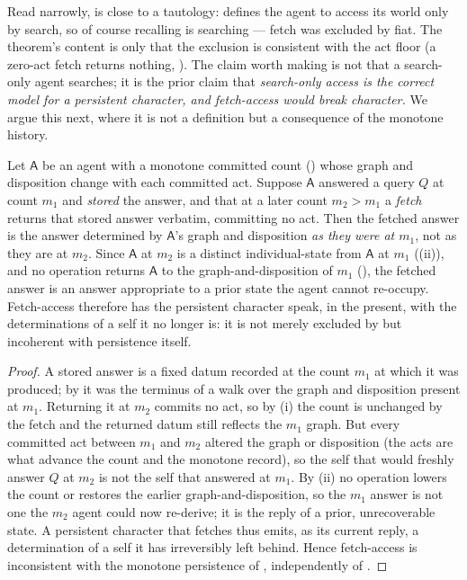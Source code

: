 \documentclass[11pt,twocolumn,a4paper]{article}
\newcommand{\Agent}{\mathsf{A}}
\newcommand{\cnt}{m}                 %
\begin{document}
\begin{remark}
\label{rem:recsearch-honest}
Read narrowly,  is close to a tautology:
 defines the agent to access its world only by search, so
of course recalling is searching --- fetch was excluded by fiat. The
theorem's content is only that the exclusion is consistent with the act
floor (a zero-act fetch returns nothing, ). The claim
worth making is not that a search-only agent searches; it is the prior
claim that \emph{search-only access is the correct model for a persistent
character, and fetch-access would break character.} We argue this next,
where it is not a definition but a consequence of the monotone history.
\end{remark}

\begin{proposition}
\label{prop:fetch-incoherent}
Let $\Agent$ be an agent with a monotone committed count
() whose graph and disposition change with each committed
act. Suppose $\Agent$ answered a query $Q$ at count $\cnt_1$ and \emph{stored}
the answer, and that at a later count $\cnt_2>\cnt_1$ a \emph{fetch}
returns that stored answer verbatim, committing no act. Then the fetched
answer is the answer determined by $\Agent$'s graph and disposition
\emph{as they were at $\cnt_1$}, not as they are at $\cnt_2$. Since
$\Agent$ at $\cnt_2$ is a distinct individual-state from $\Agent$ at
$\cnt_1$ ((ii)), and no operation returns $\Agent$ to the
graph-and-disposition of $\cnt_1$ (), the fetched answer
is an answer appropriate to a prior state the agent cannot re-occupy.
Fetch-access therefore has the persistent character speak, in the present,
with the determinations of a self it no longer is: it is not merely
excluded by  but incoherent with persistence itself.
\end{proposition}

\begin{proof}
A stored answer is a fixed datum recorded at the count $\cnt_1$ at which it
was produced; by  it was the terminus of a walk over the
graph and disposition present at $\cnt_1$. Returning it at $\cnt_2$
commits no act, so by (i) the count is unchanged by the
fetch and the returned datum still reflects the $\cnt_1$ graph. But every
committed act between $\cnt_1$ and $\cnt_2$ altered the graph or
disposition (the acts are what advance the count and the monotone record),
so the self that would freshly answer $Q$ at $\cnt_2$ is not the self that
answered at $\cnt_1$. By (ii) no operation lowers the
count or restores the earlier graph-and-disposition, so the $\cnt_1$ answer
is not one the $\cnt_2$ agent could now re-derive; it is the reply of a
prior, unrecoverable state. A persistent character that fetches thus
emits, as its current reply, a determination of a self it has irreversibly
left behind. Hence fetch-access is inconsistent with the monotone
persistence of , independently of .
\end{proof}
\end{document}
